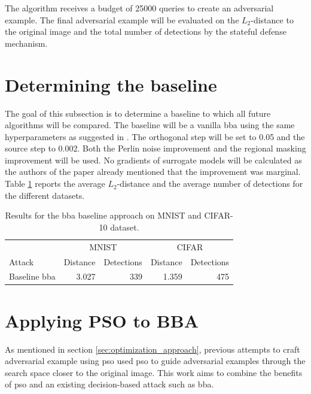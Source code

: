 The algorithm receives a budget of \num{25000} queries to create an adversarial example. The final adversarial example will be evaluated on the $L_2$-distance to the original image and the total number of detections by the stateful defense mechanism.

\section{Determining the baseline}\label{sec:baseline}
The goal of this subsection is to determine a baseline to which all future algorithms will be compared. The baseline will be a vanilla \gls{bba} using the same hyperparameters as suggested in \cite{brunner_guessing_2019}. The orthogonal step will be set to 0.05 and the source step to 0.002. Both the Perlin noise improvement and the regional masking improvement will be used. No gradients of surrogate models will be calculated as the authors of the paper already mentioned that the improvement was marginal.\\

Table \ref{tbl:baseline} reports the average $L_2$-distance and the average number of detections for the different datasets. 

\begin{table}
	\centering
	\caption[Baseline results]{Results for the \gls{bba} baseline approach on MNIST and CIFAR-10 dataset.}
	\label{tbl:baseline}
	\begin{tabular}{lrrrr}\toprule
			& \multicolumn{2}{c}{MNIST} &\multicolumn{2}{c}{CIFAR} \\ \cmidrule(r){2-3} \cmidrule(r){4-5}
	Attack				&Distance	&Detections	&Distance	&Detections \\ \midrule
	Baseline \gls{bba}	&3.027		&339		&1.359			&475 \\ \bottomrule
	
	\end{tabular}
\end{table}

\section{Applying PSO to BBA} \label{sec:combining_pso_bba}
As mentioned in section \ref{sec:optimization_approach}, previous attempts to craft adversarial example using \gls{pso} used \gls{pso} to guide adversarial examples through the search space closer to the original image. This work aims to combine the benefits of \gls{pso} and an existing decision-based attack such as \gls{bba}.\\


